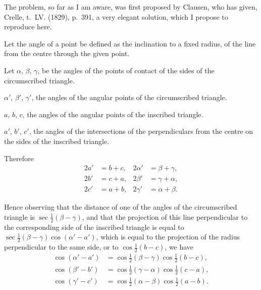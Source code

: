 \documentclass[11pt,a4paper]{book}
\begin{document}
The problem, so far as I am aware, was first proposed by Clausen, who has given, Crelle, t.~LV. (1829), p.~391, a very elegant solution, which I propose to reproduce here.

Let the angle of a point be defined as the inclination to a fixed radius, of the line from the centre through the given point.

Let $\alpha$, $\beta$, $\gamma$, be the angles of the points of contact of the sides of the circumscribed triangle.

$\alpha'$, $\beta'$, $\gamma'$, the angles of the angular points of the circumscribed triangle.

$a$, $b$, $c$, the angles of the angular points of the inscribed triangle.

$a'$, $b'$, $c'$, the angles of the intersections of the perpendiculars from the centre on the sides of the inscribed triangle.

Therefore
\begin{align*}
2a' &= b+c, & 2\alpha' &= \beta + \gamma,\\
2b' &= c+a, & 2\beta' &= \gamma + \alpha,\\
2c' &= a+b, & 2\gamma' &= \alpha + \beta.
\end{align*}

Hence observing that the distance of one of the angles of the circumscribed triangle is $\sec\tfrac{1}{2}(\beta - \gamma)$, and that the projection of this line perpendicular to the corresponding side of the inscribed triangle is equal to $\sec\tfrac{1}{2}(\beta - \gamma)\cos(\alpha' - a')$, which is equal to the projection of the radius perpendicular to the same side, or to $\cos\tfrac{1}{2}(b - c)$, we have
\begin{align*}
\cos(\alpha' - a') &= \cos\tfrac{1}{2}(\beta - \gamma)\cos\tfrac{1}{2}(b - c),\\
\cos(\beta' - b') &= \cos\tfrac{1}{2}(\gamma - \alpha)\cos\tfrac{1}{2}(c - a),\\
\cos(\gamma' - c') &= \cos\tfrac{1}{2}(\alpha - \beta)\cos\tfrac{1}{2}(a - b).
\end{align*}
\end{document}
